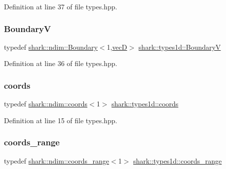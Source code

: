 Definition at line 37 of file types.\+hpp.

\hypertarget{namespaceshark_1_1types1d_ae98e359b1d44eb9d5b96e966e7ebe29e}{}\label{namespaceshark_1_1types1d_ae98e359b1d44eb9d5b96e966e7ebe29e} 
\subsubsection{\texorpdfstring{BoundaryV}{BoundaryV}}
{\footnotesize\ttfamily typedef \hyperlink{classshark_1_1ndim_1_1_boundary}{shark\+::ndim\+::\+Boundary}$<$1,\hyperlink{namespaceshark_1_1types1d_a96b222de82755e7cdf915ca4652abb00}{vecD}$>$ \hyperlink{namespaceshark_1_1types1d_ae98e359b1d44eb9d5b96e966e7ebe29e}{shark\+::types1d\+::\+BoundaryV}}



Definition at line 36 of file types.\+hpp.

\hypertarget{namespaceshark_1_1types1d_a41447c69d155fbe67345673292846aff}{}\label{namespaceshark_1_1types1d_a41447c69d155fbe67345673292846aff} 
\subsubsection{\texorpdfstring{coords}{coords}}
{\footnotesize\ttfamily typedef \hyperlink{structshark_1_1ndim_1_1coords}{shark\+::ndim\+::coords}$<$1$>$ \hyperlink{namespaceshark_1_1types1d_a41447c69d155fbe67345673292846aff}{shark\+::types1d\+::coords}}



Definition at line 15 of file types.\+hpp.

\hypertarget{namespaceshark_1_1types1d_a86c482888835159e049d3464ca5b244e}{}\label{namespaceshark_1_1types1d_a86c482888835159e049d3464ca5b244e} 
\subsubsection{\texorpdfstring{coords\+\_\+range}{coords\_range}}
{\footnotesize\ttfamily typedef \hyperlink{structshark_1_1ndim_1_1coords__range}{shark\+::ndim\+::coords\+\_\+range}$<$1$>$ \hyperlink{namespaceshark_1_1types1d_a86c482888835159e049d3464ca5b244e}{shark\+::types1d\+::coords\+\_\+range}}



